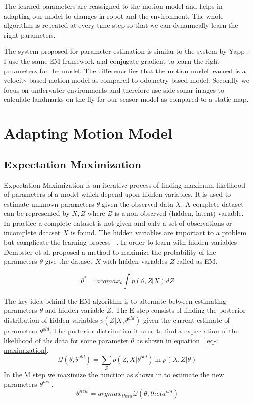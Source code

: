 \documentclass[12pt,draft]{dalcsthesis}
\begin{document}
The learned parameters are reassigned to the motion model and helps in adapting our model to changes in robot and the environment. The whole algorithm is repeated at every time step so that we can dynamically learn the right parameters.

The system proposed for parameter estimation is similar to the system by Yapp \cite{Yap2008}. I use the same EM framework and conjugate gradient to learn the right parameters for the model. The difference lies that the motion model learned is a velocity based motion model as compared to odometry based model. Secondly we focus on underwater environments and therefore use side sonar images to calculate landmarks on the fly for our sensor model as compared to a static map.

\section{Adapting Motion Model}
\subsection{Expectation Maximization}

Expectation Maximization is an iterative process of finding maximum likelihood of parameters of a model which depend upon hidden variables. It is used to estimate unknown parameters $\theta$ given the observed data $X$. A complete dataset can be represented by ${X,Z}$ where $Z$ is a non-observed (hidden, latent) variable. In practice a complete dataset is not given and only a set of observations or incomplete dataset $X$ is found. The hidden variables are important to a problem but complicate the learning process ~\cite{russell2003artificial}. In order to learn with hidden variables Dempster et al. \cite{dempster1977maximum} proposed a method to maximize the probability of the parameters $\theta$ give the dataset $X$ with hidden variables $Z$ called as EM.

\begin{equation}
\label{eq-:em_description}
\theta^{*}=arg max_{\theta} \int p(\theta,Z|X)dZ
\end{equation}

The key idea behind the EM algorithm is to alternate between estimating parameters $\theta$ and hidden variable $Z$.
The E step consists of finding the posterior distribution of hidden variables $p(Z|X,\theta^{old})$ given the current estimate of parameters $\theta^{old}$. The posterior distribution it used to find a expectation of the likelihood of the data for some parameter $\theta$ as shown in equation ~\ref{eq-: maximization}. 
\begin{equation}
\label{eq-:maximization}
\mathcal{Q}(\theta,\theta^{old})=\sum_{Z}p(Z,X|\theta^{old}) \ln p(X,Z|\theta)
\end{equation}
In the M step we maximize the function as shown in  to estimate the new parameters $\theta^{new}$.
\begin{equation}
\theta^{new}=arg max_{theta} \mathcal{Q}(\theta,theta^{old})
\end{equation}
\end{document}
